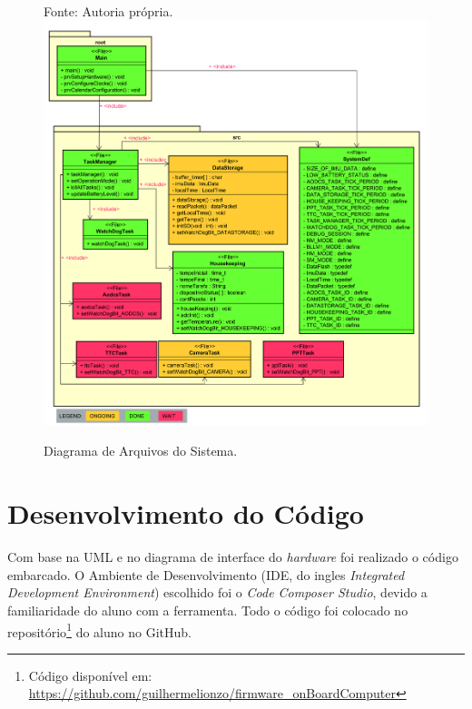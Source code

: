 \begin{itemize}
	\begin{figure}[h]
	\footnotesize{	
		\centering
			\centering
		\footnotesize{Fonte: Autoria própria.}
		\includegraphics[keepaspectratio=true,scale=0.36]{figuras/CSS.png}
		\caption{Diagrama de Arquivos do Sistema.}
		\label{uml_da}
	}
	\end{figure}
	\FloatBarrier

	
	
\end{itemize}

\newpage
\section{Desenvolvimento do Código}

Com base na UML e no diagrama de interface do \textit{hardware} foi realizado o código embarcado. O Ambiente de Desenvolvimento (IDE, do ingles \textit{Integrated Development Environment}) escolhido foi o \textit{Code Composer Studio}, devido  a familiaridade do aluno com a ferramenta. Todo o código foi colocado no repositório\footnote{Código disponível em: \url{https://github.com/guilhermelionzo/firmware_onBoardComputer}} do aluno no GitHub. 

